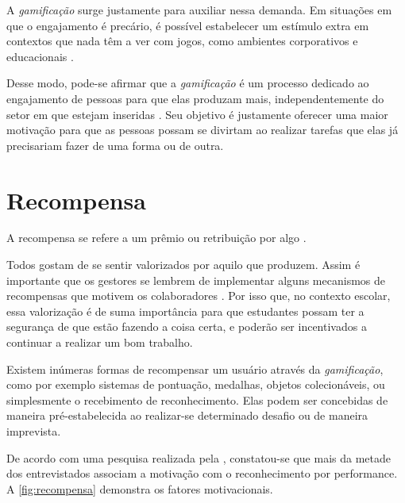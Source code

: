 A \textit{gamificação} surge justamente para auxiliar nessa demanda. Em situações em que o engajamento é precário, é possível estabelecer um estímulo extra em contextos que nada têm a ver com jogos, como ambientes corporativos e educacionais
\cite{gamificacao-corporativa:2017}.


Desse modo, pode-se afirmar que a \textit{gamificação} é um processo dedicado ao engajamento de pessoas para que elas produzam mais, independentemente do setor em que estejam inseridas
\cite{gamificacao-corporativa:2017}. Seu objetivo é justamente oferecer uma maior motivação para que as pessoas possam se divirtam ao realizar tarefas que elas já precisariam fazer de uma forma ou de outra.


\section{Recompensa}
A recompensa se refere a um prêmio ou retribuição por algo \cite{dicio-recompensa:2009}.


Todos gostam de se sentir valorizados por aquilo que produzem. Assim é importante que os gestores se lembrem de implementar alguns mecanismos de recompensas que motivem os colaboradores \cite{gamificacao-corporativa:2017}. Por isso que, no contexto escolar, essa valorização é de suma importância para que estudantes possam ter a segurança de que estão fazendo a coisa certa, e poderão ser incentivados a continuar a realizar um bom trabalho.

Existem inúmeras formas de recompensar um usuário através da \textit{gamificação}, como por exemplo sistemas de pontuação, medalhas, objetos colecionáveis, ou simplesmente o recebimento de reconhecimento. Elas podem ser concebidas de maneira pré-estabelecida ao realizar-se determinado desafio ou de maneira imprevista.


De acordo com uma pesquisa realizada pela \cite{grafico-motivacao:2012}, constatou-se que mais da metade dos entrevistados associam a motivação com o reconhecimento por performance. A \autoref{fig:recompensa} demonstra os fatores motivacionais.

